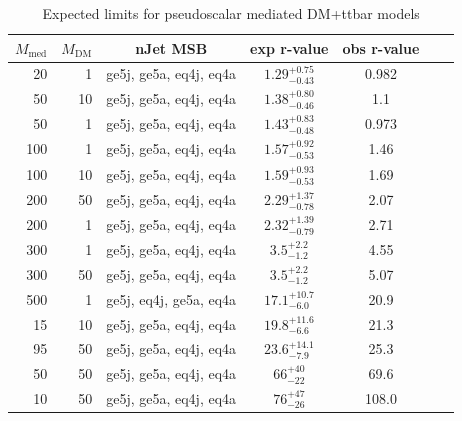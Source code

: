 \begin{table}
  \centering
  \begin{tabular}{rrccccc}
    \hline\hline
    $M_{\text{med}}$ & $M_{\text{DM}}$ & nJet MSB & exp r-value & obs r-value \\
    \hline
       20 &   1 & ge5j, ge5a, eq4j, eq4a & $1.29_{-0.43}^{+0.75}$ & 0.982 \\
       50 &  10 & ge5j, ge5a, eq4j, eq4a & $1.38_{-0.46}^{+0.80}$ & 1.1 \\
       50 &   1 & ge5j, ge5a, eq4j, eq4a & $1.43_{-0.48}^{+0.83}$ & 0.973 \\
      100 &   1 & ge5j, ge5a, eq4j, eq4a & $1.57_{-0.53}^{+0.92}$ & 1.46 \\
      100 &  10 & ge5j, ge5a, eq4j, eq4a & $1.59_{-0.53}^{+0.93}$ & 1.69 \\
      200 &  50 & ge5j, ge5a, eq4j, eq4a & $2.29_{-0.78}^{+1.37}$ & 2.07 \\
      200 &   1 & ge5j, ge5a, eq4j, eq4a & $2.32_{-0.79}^{+1.39}$ & 2.71 \\
      300 &   1 & ge5j, ge5a, eq4j, eq4a & $3.5_{-1.2}^{+2.2}$    & 4.55 \\
      300 &  50 & ge5j, ge5a, eq4j, eq4a & $3.5_{-1.2}^{+2.2}$    & 5.07 \\
      500 &   1 & ge5j, eq4j, ge5a, eq4a & $17.1_{-6.0}^{+10.7}$  & 20.9 \\
       15 &  10 & ge5j, ge5a, eq4j, eq4a & $19.8_{-6.6}^{+11.6}$  & 21.3 \\
       95 &  50 & ge5j, ge5a, eq4j, eq4a & $23.6_{-7.9}^{+14.1}$  & 25.3 \\
       50 &  50 & ge5j, ge5a, eq4j, eq4a & $66_{-22}^{+40}$       & 69.6 \\
       10 &  50 & ge5j, ge5a, eq4j, eq4a & $76_{-26}^{+47}$       & 108.0 \\
    \hline\hline
  \end{tabular}
  \caption{Expected limits for pseudoscalar mediated DM+ttbar models}
  \label{tab:DMttPS_limits}
\end{table}








